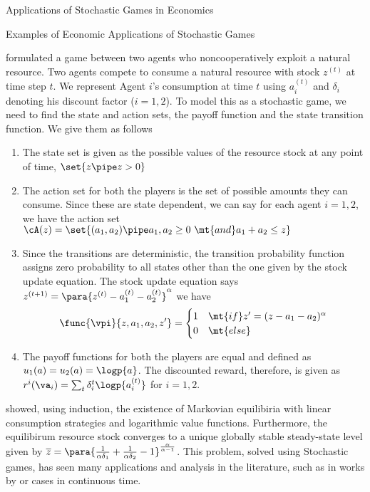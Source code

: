 \documentclass{article}
\begin{document}
\begin{psection}{Applications of Stochastic Games in Economics}
\begin{psubsection}{Examples of Economic Applications of Stochastic Games}

		\cite{cap-acc} formulated a game between two agents who noncooperatively exploit a natural resource. Two agents compete to consume a natural resource with stock $z^{(t)}$ at time step $t$. We represent Agent $i$'s consumption at time $t$ using $a^{(t)}_i$ and $\delta_i$ denoting his discount factor ($i = 1, 2$). To model this as a stochastic game, we need to find the state and action sets, the payoff function and the state transition function. We give them as follows
		\begin{enumerate}
			\item The state set is given as the possible values of the resource stock at any point of time, \ie $\set{z \pipe z > 0}$
			\item The action set for both the players is the set of possible amounts they can consume. Since these are state dependent, we can say for each agent $i = 1, 2$, we have the action set $\cA(z) = \set{(a_1, a_2) \pipe a_1, a_2 \ge 0\ \mt{and} a_1 + a_2 \le z}$
			\item Since the transitions are deterministic, the transition probability function assigns zero probability to all states other than the one given by the stock update equation. The stock update equation says $z^{(t + 1)} = \para{z^{(t)} - a^{(t)}_1 - a^{(t)}_2}^{\alpha}$ \ie we have
				\begin{align*}
					\func{\vpi}{z, a_1, a_2, z'} = \begin{cases}
						1 & \mt{if} z' = (z - a_1 - a_2)^\alpha \\
						0 & \mt{else}
					\end{cases}
				\end{align*}
			\item The payoff functions for both the players are equal and defined as $u_1(a) = u_2(a) = \logp{a}$. The discounted reward, therefore, is given as $r^i(\va_i) = \sum_t \delta_i^t \logp{a_i^{(t)}}$ for $i=1,2$.
		\end{enumerate}

		\cite{cap-acc} showed, using induction, the existence of Markovian equilibiria with linear consumption strategies and logarithmic value functions. Furthermore, the equilibirum resource stock converges to a unique globally stable steady-state level given by $\overline{z} = \para{\frac{1}{\alpha\delta_1} + \frac{1}{\alpha \delta_2} - 1}^{\frac{\alpha}{\alpha - 1}}$. This problem, solved using Stochastic games, has seen many applications and analysis in the literature, such as in works by \cite{dutta-sun1, dutta-sun2, dutta-sun3} or cases in continuous time.


\end{psubsection}
\end{psection}
\end{document}
